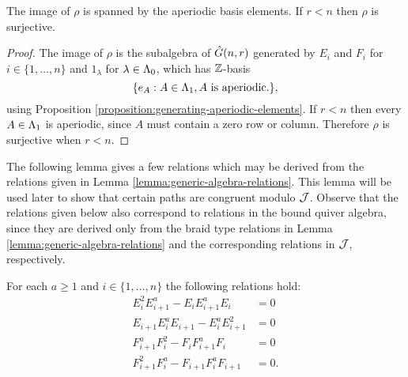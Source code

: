 \documentclass[a4paper, 11pt]{report}
\begin{document}
\begin{proposition}\label{proposition:image-of-quiver-algebra-generic}
The image of $\rho$ is spanned by the aperiodic basis elements. If $r<n$ then $\rho$ is surjective.
\end{proposition}

\begin{proof}
The image of $\rho$ is the subalgebra of $\hat{G}(n,r)$ generated by $E_i$ and $F_i$ for $i\in\{1,\ldots,n\}$ and $1_\lambda$ for $\lambda\in\Lambda_0{}$, which has $\mathbb{Z}$-basis
\begin{equation*}
\{e_A:A\in\Lambda_1{}, A\text{ is aperiodic.}\},
\end{equation*}
using Proposition \ref{proposition:generating-aperiodic-elements}. If $r<n$ then every $A\in\Lambda_1{}$ is aperiodic, since $A$ must contain a zero row or column. Therefore $\rho$ is surjective when $r<n$.
\end{proof}

The following lemma gives a few relations which may be derived from the relations given in Lemma \ref{lemma:generic-algebra-relations}. This lemma will be used later to show that certain paths are congruent modulo $\mathcal{J}$. Observe that the relations given below also correspond to relations in the bound quiver algebra, since they are derived only from the braid type relations in Lemma \ref{lemma:generic-algebra-relations} and the corresponding relations in $\mathcal{J}$, respectively.

\begin{lemma}\label{lemma:generic-higher-braid-relations}
For each $a\geq 1$ and $i\in\{1,\ldots,n\}$ the following relations hold:
\begin{align}
E_i^2 E_{i+1}^a -E_iE_{i+1}^a E_i &= 0\\
E_{i+1}E_i^aE_{i+1} -E_i^aE_{i+1}^2 &= 0\\
F_{i+1}^aF_i^2 -F_iF_{i+1}^aF_i &= 0\\
F_{i+1}^2F_i^a -F_{i+1}F_i^aF_{i+1} &= 0.
\end{align}
\end{lemma}
\end{document}
